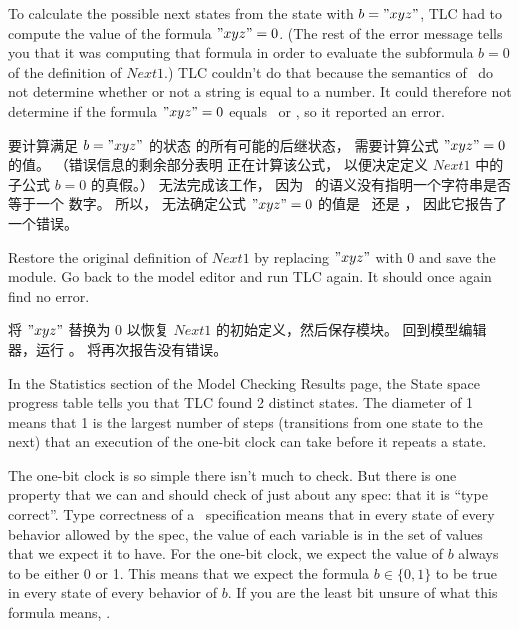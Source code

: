 \begin{en}
To calculate the possible next states from the state with $b="xyz"$,
TLC had to compute the value of the formula $"xyz"=0$.  (The rest of
the error message tells you that it was computing that formula in
order to evaluate the subformula $b=0$ of the definition of $Next1$.)
TLC couldn't do that because the semantics of \tlaplus\ do not
determine whether or not a string is equal to a 
number.  It could
therefore not determine if the formula $"xyz"=0$ equals \TRUE\ or
\FALSE, so it reported an error. 
\end{en}

\begin{ch}
  要计算满足 $b="xyz"$ 的状态  的所有可能的后继状态，
  \tlc{} 需要计算公式 $"xyz"=0$ 的值。
  （错误信息的剩余部分表明 \tlc{} 正在计算该公式，
  以便决定定义 $Next1$ 中的子公式 $b=0$ 的真假。）
  \tlc{} 无法完成该工作，
  因为 \tlaplus\ 的语义没有指明一个字符串是否等于一个
  数字。
  所以，\tlc{} 无法确定公式 $"xyz"=0$ 的值是 \TRUE\ 还是 \FALSE，
  因此它报告了一个错误。
\end{ch}

\begin{en}
Restore the original definition of $Next1$ by replacing $"xyz"$ with 0
and save the module.  Go back to the model editor and run TLC again.
It should once again find no error.
\end{en}

\begin{ch}
  将 $"xyz"$ 替换为 0 以恢复 $Next1$ 的初始定义，然后保存模块。
  回到模型编辑器，运行 \tlc{}。
  \tlc{} 将再次报告没有错误。
\end{ch}

\pause
%
\noindent 
%
In the \textsf{Statistics} section of the \textsf{Model Checking
Results} page, the \textsf{State space progress} table tells you that
TLC found 2 distinct states.  The diameter of 1 means that 1 is the
largest number of steps (transitions from one state to the next) that
an execution of the one-bit clock can take before it repeats a state.

The one-bit clock is so simple there isn't much to check.  But there
is one property that we can and should check of just about any spec:
that it is 
``type correct''.  Type correctness of a \tlaplus\ specification
means that in every state of every behavior allowed by the spec, the
value of each variable is in the set of values that we expect it to
have.  For the one-bit clock, we expect the value of $b$ always to be
either 0 or 1.  This means that we expect the formula $b\in\{0,1\}$ to
be true in every state of every behavior of $b$.  If you are the least
bit unsure of what this formula means,
\textsf{}.

